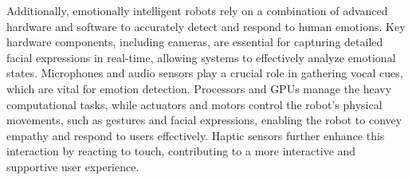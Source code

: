 Additionally, emotionally intelligent robots rely on a combination of advanced hardware and software
to accurately detect and respond to human emotions. Key hardware components, including cameras,
are essential for capturing detailed facial expressions in real-time, allowing systems to effectively analyze
emotional states. Microphones and audio sensors play a crucial role in gathering vocal cues, which
are vital for emotion detection. Processors and GPUs manage the heavy computational tasks, while
actuators and motors control the robot’s physical movements, such as gestures and facial expressions,
enabling the robot to convey empathy and respond to users effectively. Haptic sensors further enhance
this interaction by reacting to touch, contributing to a more interactive and supportive user experience.
